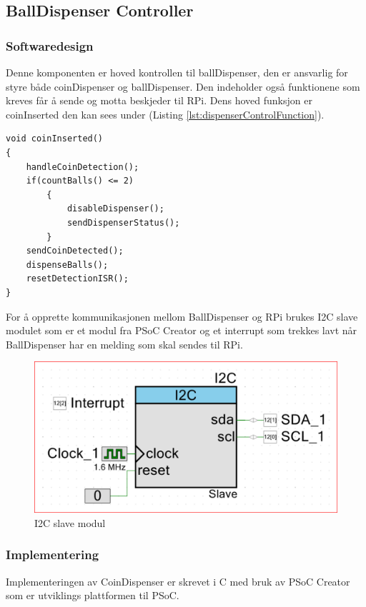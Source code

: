 \documentclass[Rapport/Rapport_main.tex]{subfiles}
\begin{document}
\subsection{BallDispenser Controller}
\subsubsection{Softwaredesign}
Denne komponenten er hoved kontrollen til ballDispenser, den er ansvarlig for styre både coinDispenser og ballDispenser. Den indeholder også funktionene som kreves får å sende og motta beskjeder til RPi. Dens hoved funksjon er coinInserted den kan sees under (Listing \ref{lst:dispenserControlFunction}). 
\begin{lstlisting}[caption={Hoved kontrol funksjonen til ballDispenser},style=customc,label={lst:dispenserControlFunction}]
void coinInserted()
{
    handleCoinDetection();
    if(countBalls() <= 2)
        {
            disableDispenser(); 
            sendDispenserStatus();
        }
    sendCoinDetected();
    dispenseBalls();
    resetDetectionISR();
}
\end{lstlisting}

For å opprette kommunikasjonen mellom BallDispenser og RPi brukes I2C slave modulet som er et modul fra PSoC Creator og et interrupt som trekkes lavt når BallDispenser har en melding som skal sendes til RPi.
\begin{figure}[H]
    \centering
    \includegraphics[width=\textwidth]{Rapport/BallDispenser/ballDispenserController/graphics/I2Cslave.png}
    \caption{I2C slave modul}
    \label{fig:I2CSlaveBallDisp}
\end{figure}

\subsubsection{Implementering}
Implementeringen av CoinDispenser er skrevet i C med bruk av PSoC Creator som er utviklings plattformen til PSoC.
\end{document}
